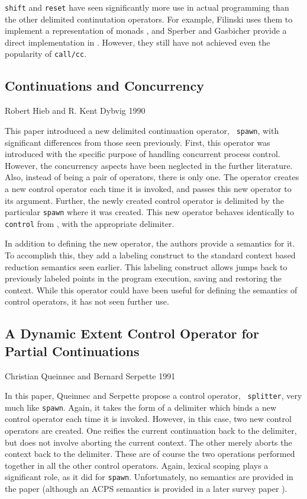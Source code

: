 \documentclass[12pt]{article}
\begin{document}
{\tt shift} and {\tt reset} have seen significantly more use in actual
programming than the other delimited continutation operators.  For
example, Filinski uses them to implement a representation of monads
\cite{monads}, and Sperber and Gasbicher provide a direct
implementation in \cite{581504}.  However, they still have not
achieved even the popularity of {\tt call/cc}.

\subsection*{Continuations and Concurrency}
Robert Hieb and R. Kent Dybvig 1990 \cite{hieb90continuations}

This paper introduced a new delimited continuation operator, {\tt
spawn}, with significant differences from those seen previously.
First, this operator was introduced with the specific purpose of
handling concurrent process control.  However, the concurrency aspects
have been neglected in the further literature.  Also, instead of being
a pair of operators, there is only one.  The operator creates a new
control operator each time it is invoked, and passes this new operator
to its argument.  Further, the newly created control operator is
delimited by the particular {\tt spawn} where it was created.  This
new operator behaves identically to {\tt control} from
\cite{sitaram90control}, with the appropriate delimiter.

In addition to defining the new operator, the authors provide a
semantics for it.  To accomplish this, they add a labeling construct
to the standard context based reduction semantics seen earlier.  This
labeling construct allows jumps back to previously labeled points in
the program execution, saving and restoring the context.  While this
operator could have been useful for defining the semantics of control
operators, it has not seen further use.  

\subsection*{A Dynamic Extent Control Operator for Partial
  Continuations}
Christian Queinnec and Bernard Serpette 1991 \cite{queinnec91dynamic}

In this paper, Queinnec and Serpette propose a control operator, {\tt
splitter}, very much like {\tt spawn}.  Again, it takes the form of a
delimiter which binds a new control operator each time it is invoked.
However, in this case, two new control operators are created.  One
reifies the current continuation back to the delimiter, but does not
involve aborting the current context.  The other merely aborts the
context back to the delimiter.  These are of course the two operations
performed together in all the other control operators.  Again, lexical
scoping plays a significant role, as it did for {\tt spawn}.
Unfortunately, no semantics are provided in the paper (although an
ACPS semantics is provided in a later survey paper \cite{queinnec93library}).
\end{document}
